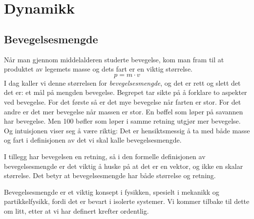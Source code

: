 \chapter{Dynamikk}
\section{Bevegelsesmengde}
Når man gjennom middelalderen studerte bevegelse, kom man fram til at produktet av legemets masse og dets fart er en viktig størrelse.
\[p = m \cdot v\]
I dag kaller vi denne størrelsen for \textit{bevegelsesmengde}, og det er rett og slett det det er: et mål på mengden bevegelse. Begrepet tar sikte på å forklare to aspekter ved bevegelse. For det første så er det mye bevegelse når farten er stor. For det andre er det mer bevegelse når massen er stor. En bøffel som løper på savannen har bevegelse. Men 100 bøfler som løper i samme retning utgjør mer bevegelse. Og intuisjonen viser seg å være riktig: Det er hensiktsmessig å ta med både masse og fart i definisjonen av det vi skal kalle bevegelsesmengde.

I tillegg har bevegelsen en retning, så i den formelle definisjonen av bevegelsesmengde er det viktig å huske på at det er en vektor, og ikke en skalar størrelse. Det betyr at bevegelsesmengde har både størrelse og retning.

Bevegelsesmengde er et viktig konsept i fysikken, spesielt i mekanikk og partikkelfysikk, fordi det er bevart i isolerte systemer. Vi kommer tilbake til dette om litt, etter at vi har definert krefter ordentlig.



